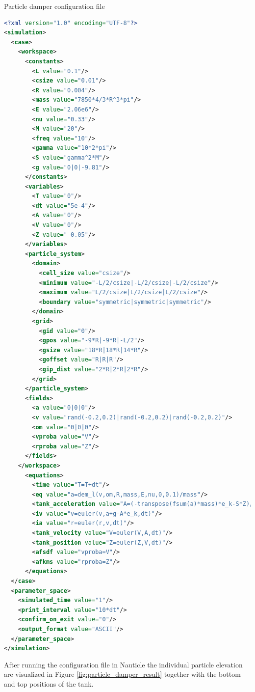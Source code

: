 \documentclass[a4paper,12pt,openany]{book}
\theoremstyle{break}
\begin{document}
\begin{example}{Particle damper configuration file}{}
\lstset{basicstyle=\tiny}
\begin{lstlisting}[language=XML]
<?xml version="1.0" encoding="UTF-8"?>
<simulation>
  <case>
    <workspace>
      <constants>
        <L value="0.1"/>
        <csize value="0.01"/>
        <R value="0.004"/>
        <mass value="7850*4/3*R^3*pi"/>
        <E value="2.06e6"/>
        <nu value="0.33"/>
        <M value="20"/>
        <freq value="10"/>
        <gamma value="10*2*pi"/>
        <S value="gamma^2*M"/>
        <g value="0|0|-9.81"/>
      </constants>
      <variables>
        <T value="0"/>
        <dt value="5e-4"/>
        <A value="0"/>
        <V value="0"/>
        <Z value="-0.05"/>
      </variables>
      <particle_system>
        <domain>
          <cell_size value="csize"/>
          <minimum value="-L/2/csize|-L/2/csize|-L/2/csize"/>
          <maximum value="L/2/csize|L/2/csize|L/2/csize"/>
          <boundary value="symmetric|symmetric|symmetric"/>
        </domain>
        <grid>
          <gid value="0"/>
          <gpos value="-9*R|-9*R|-L/2"/>
          <gsize value="18*R|18*R|14*R"/>
          <goffset value="R|R|R"/>
          <gip_dist value="2*R|2*R|2*R"/>
        </grid>
      </particle_system>
      <fields>
        <a value="0|0|0"/>
        <v value="rand(-0.2,0.2)|rand(-0.2,0.2)|rand(-0.2,0.2)"/>
        <om value="0|0|0"/>
        <vproba value="V"/>
        <rproba value="Z"/>
      </fields>
    </workspace>
      <equations>
        <time value="T=T+dt"/>
        <eq value="a=dem_l(v,om,R,mass,E,nu,0,0.1)/mass"/>
        <tank_acceleration value="A=(-transpose(fsum(a)*mass)*e_k-S*Z)/M"/>
        <iv value="v=euler(v,a+g-A*e_k,dt)"/>
        <ia value="r=euler(r,v,dt)"/>
        <tank_velocity value="V=euler(V,A,dt)"/>
        <tank_position value="Z=euler(Z,V,dt)"/>
        <afsdf value="vproba=V"/>
        <afkms value="rproba=Z"/>
      </equations>
  </case>
  <parameter_space>
    <simulated_time value="1"/>
    <print_interval value="10*dt"/>
    <confirm_on_exit value="0"/>
    <output_format value="ASCII"/>
  </parameter_space>
</simulation>
\end{lstlisting}
\end{example}
After running the configuration file in Nauticle the individual particle elevation are visualized in Figure \ref{fig:particle_damper_result} together with the bottom and top positions of the tank.
\end{document}
